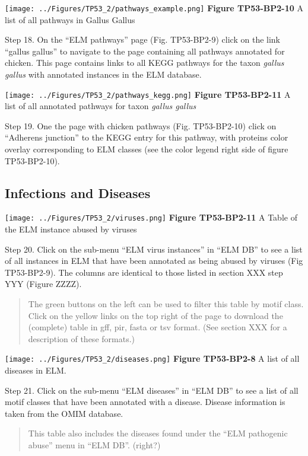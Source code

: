 \texttt{[image: ../Figures/TP53\_2/pathways\_example.png]} \textbf{Figure
TP53-BP2-10} A list of all pathways in Gallus Gallus

Step 18. On the ``ELM pathways'' page (Fig. TP53-BP2-9) click on the
link ``gallus gallus'' to navigate to the page containing all pathways
annotated for chicken. This page contains links to all KEGG pathways for
the taxon \emph{gallus gallus} with annotated instances in the ELM
database.

\texttt{[image: ../Figures/TP53\_2/pathways\_kegg.png]} \textbf{Figure
TP53-BP2-11} A list of all annotated pathways for taxon \emph{gallus
gallus}

Step 19. One the page with chicken pathways (Fig. TP53-BP2-10) click on
``Adherens junction'' to the KEGG entry for this pathway, with proteins
color overlay corresponding to ELM classes (see the color legend right
side of figure TP53-BP2-10).

\subsection{Infections and Diseases}\label{infections-and-diseases}

\texttt{[image: ../Figures/TP53\_2/viruses.png]} \textbf{Figure
TP53-BP2-11} A Table of the ELM instance abused by viruses

Step 20. Click on the sub-menu ``ELM virus instances'' in ``ELM DB'' to
see a list of all instances in ELM that have been annotated as being
abused by viruses (Fig TP53-BP2-9). The columns are identical to those
listed in section XXX step YYY (Figure ZZZZ).

\begin{quote}
The green buttons on the left can be used to filter this table by motif
class. Click on the yellow links on the top right of the page to
download the (complete) table in gff, pir, fasta or tsv format. (See
section XXX for a description of these formats.)
\end{quote}

\texttt{[image: ../Figures/TP53\_2/diseases.png]} \textbf{Figure
TP53-BP2-8} A list of all diseases in ELM.

Step 21. Click on the sub-menu ``ELM diseases'' in ``ELM DB'' to see a
list of all motif classes that have been annotated with a disease.
Disease information is taken from the OMIM database.

\begin{quote}
This table also includes the diseases found under the ``ELM pathogenic
abuse'' menu in ``ELM DB''. (right?)
\end{quote}

